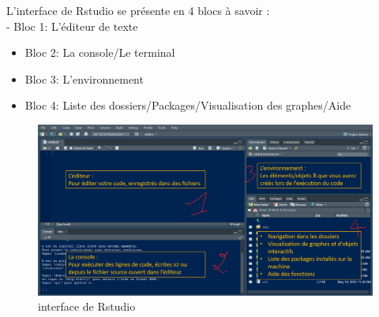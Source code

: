 \documentclass[
]{article}
\begin{document}
L'interface de Rstudio se présente en 4 blocs à savoir :\\
- Bloc 1: L'éditeur de texte

\begin{itemize}
\item
  Bloc 2: La console/Le terminal
\item
  Bloc 3: L'environnement
\item
  Bloc 4: Liste des dossiers/Packages/Visualisation des graphes/Aide
\end{itemize}

\begin{figure}
\centering
\includegraphics{interface Rstudio.png}
\caption{interface de Rstudio}
\end{figure}
\end{document}
